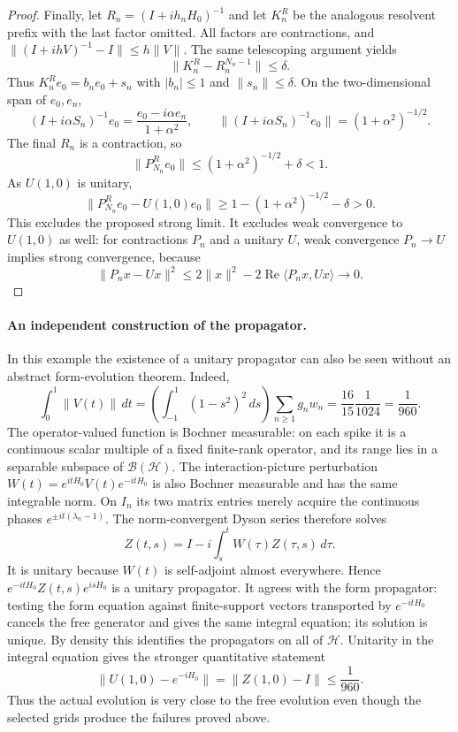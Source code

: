 \documentclass[11pt,a4paper]{article}
\theoremstyle{remark}
\begin{document}
\begin{proof}
Finally, let $R_n=(I+ih_nH_0)^{-1}$ and let $K_n^R$ be the analogous
resolvent prefix with the last factor omitted. All factors are
contractions, and
$\|(I+ihV)^{-1}-I\|\le h\|V\|$. The same telescoping argument yields
\[
 \|K_n^R-R_n^{N_n-1}\|\le\delta.
\]
Thus $K_n^Re_0=b_ne_0+s_n$ with $|b_n|\le1$ and $\|s_n\|\le\delta$.
On the two-dimensional span of $e_0,e_n$,
\[
 (I+i\alpha S_n)^{-1}e_0
   =\frac{e_0-i\alpha e_n}{1+\alpha^2},
 \qquad
 \|(I+i\alpha S_n)^{-1}e_0\|=(1+\alpha^2)^{-1/2}.
\]
The final $R_n$ is a contraction, so
\[
 \|P_{N_n}^Re_0\|\le(1+\alpha^2)^{-1/2}+\delta<1.
\]
As $U(1,0)$ is unitary,
\[
 \|P_{N_n}^Re_0-U(1,0)e_0\|
 \ge1-(1+\alpha^2)^{-1/2}-\delta>0.
\]
This excludes the proposed strong limit. It excludes weak convergence to
$U(1,0)$ as well: for contractions $P_n$ and a unitary $U$, weak
convergence $P_n\to U$ implies strong convergence, because
\[
 \|P_nx-Ux\|^2
 \le2\|x\|^2-2\operatorname{Re}\langle P_nx,Ux\rangle\longrightarrow0.
\]
\end{proof}

\paragraph{An independent construction of the propagator.}
In this example the existence of a unitary propagator can also be seen
without an abstract form-evolution theorem. Indeed,
\[
 \int_0^1\|V(t)\|\,dt
 =\left(\int_{-1}^1(1-s^2)^2\,ds\right)\sum_{n\ge1}g_nw_n
 =\frac{16}{15}\frac1{1024}=\frac1{960}.
\]
The operator-valued function is Bochner measurable: on each spike it is
a continuous scalar multiple of a fixed finite-rank operator, and its
range lies in a separable subspace of $\mathcal B(\mathcal H)$.
The interaction-picture perturbation
$W(t)=e^{itH_0}V(t)e^{-itH_0}$ is also Bochner measurable and has the
same integrable norm. On $I_n$ its two matrix entries merely acquire
the continuous phases $e^{\pm it(\lambda_n-1)}$.
The norm-convergent Dyson series therefore solves
\[
 Z(t,s)=I-i\int_s^t W(\tau)Z(\tau,s)\,d\tau.
\]
It is unitary because $W(t)$ is self-adjoint almost everywhere. Hence
$e^{-itH_0}Z(t,s)e^{isH_0}$ is a unitary propagator. It agrees with the
form propagator: testing the form equation against finite-support
vectors transported by $e^{-itH_0}$ cancels the free generator and gives
the same integral equation; its solution is unique. By density this
identifies the propagators on all of $\mathcal H$. Unitarity in the
integral equation gives the stronger quantitative statement
\[
 \|U(1,0)-e^{-iH_0}\|=\|Z(1,0)-I\|\le\frac1{960}.
\]
Thus the actual evolution is very close to the free evolution even
though the selected grids produce the failures proved above.
\end{document}
